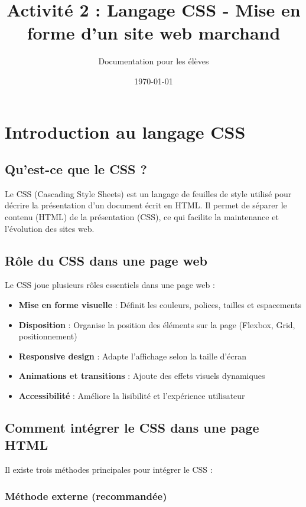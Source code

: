 \documentclass[12pt,a4paper]{article}
\title{Activité 2 : Langage CSS - Mise en forme d'un site web marchand}
\author{Documentation pour les élèves}
\date{\today}
\begin{document}
\maketitle

\tableofcontents

\section{Introduction au langage CSS}

\subsection{Qu'est-ce que le CSS ?}

Le CSS (Cascading Style Sheets) est un langage de feuilles de style utilisé pour décrire la présentation d'un document écrit en HTML. Il permet de séparer le contenu (HTML) de la présentation (CSS), ce qui facilite la maintenance et l'évolution des sites web.

\subsection{Rôle du CSS dans une page web}

Le CSS joue plusieurs rôles essentiels dans une page web :

\begin{itemize}
\item \textbf{Mise en forme visuelle} : Définit les couleurs, polices, tailles et espacements
\item \textbf{Disposition} : Organise la position des éléments sur la page (Flexbox, Grid, positionnement)
\item \textbf{Responsive design} : Adapte l'affichage selon la taille d'écran
\item \textbf{Animations et transitions} : Ajoute des effets visuels dynamiques
\item \textbf{Accessibilité} : Améliore la lisibilité et l'expérience utilisateur
\end{itemize}

\subsection{Comment intégrer le CSS dans une page HTML}

Il existe trois méthodes principales pour intégrer le CSS :

\subsubsection{Méthode externe (recommandée)}
\end{document}
